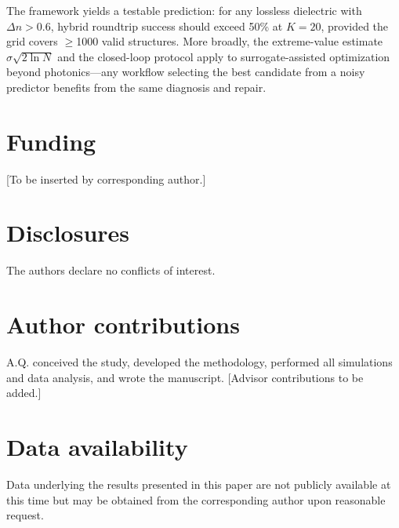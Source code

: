 \documentclass[10pt,twocolumn]{article}
\begin{document}
The framework yields a testable prediction: for any lossless dielectric with $\Delta n > 0.6$, hybrid roundtrip success should exceed 50\% at $K = 20$, provided the grid covers $\ge$1000 valid structures. More broadly, the extreme-value estimate $\sigma\sqrt{2\ln N}$ and the closed-loop protocol apply to surrogate-assisted optimization beyond photonics---any workflow selecting the best candidate from a noisy predictor benefits from the same diagnosis and repair.

\section*{Funding}
[To be inserted by corresponding author.]

\section*{Disclosures}
The authors declare no conflicts of interest.

\section*{Author contributions}
A.Q. conceived the study, developed the methodology, performed all simulations and data analysis, and wrote the manuscript. [Advisor contributions to be added.]

\section*{Data availability}
Data underlying the results presented in this paper are not publicly available at this time but may be obtained from the corresponding author upon reasonable request.
\end{document}

